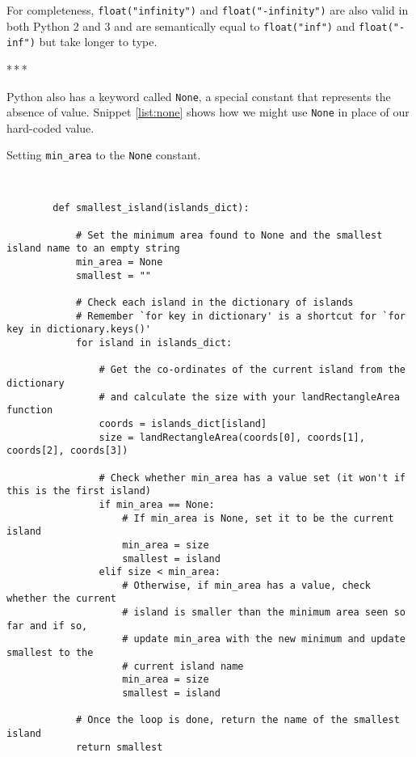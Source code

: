 \documentclass[a4paper]{article}
\newcommand{\asterism}{\bigskip\par\centerline{*\,*\,*}\medskip\par}%
\begin{document}
For completeness, \texttt{float("infinity")} and \texttt{float("-infinity")} are also valid
in both Python 2 and 3 and are semantically equal to \texttt{float("inf")} and \texttt{float("-inf")} but
take longer to type.

\vskip -0.1cm
\asterism
\vskip -0.3cm

Python also has a keyword called \texttt{None}, a special constant that represents
the absence of value. Snippet \ref{list:none} shows how we might use \texttt{None}
in place of our hard-coded value.

\begin{listing}[H]
    \caption[]{Setting \texttt{min\_area} to the \texttt{None} constant.}
    \label{list:none}
    \begin{verbatim}


        def smallest_island(islands_dict):

            # Set the minimum area found to None and the smallest island name to an empty string
            min_area = None
            smallest = ""

            # Check each island in the dictionary of islands
            # Remember `for key in dictionary' is a shortcut for `for key in dictionary.keys()'
            for island in islands_dict:

                # Get the co-ordinates of the current island from the dictionary
                # and calculate the size with your landRectangleArea function
                coords = islands_dict[island]
                size = landRectangleArea(coords[0], coords[1], coords[2], coords[3])

                # Check whether min_area has a value set (it won't if this is the first island)
                if min_area == None:
                    # If min_area is None, set it to be the current island
                    min_area = size
                    smallest = island
                elif size < min_area:
                    # Otherwise, if min_area has a value, check whether the current
                    # island is smaller than the minimum area seen so far and if so,
                    # update min_area with the new minimum and update smallest to the
                    # current island name
                    min_area = size
                    smallest = island

            # Once the loop is done, return the name of the smallest island
            return smallest

    \end{verbatim}
\end{listing}
\end{document}
